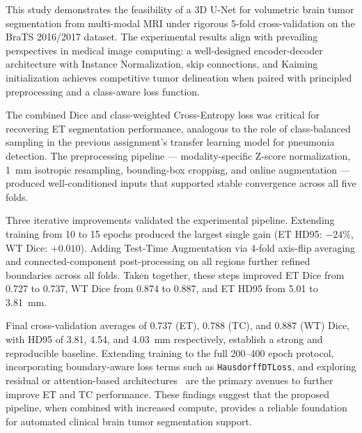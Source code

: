 \documentclass[10pt,twocolumn]{article}
\begin{document}
This study demonstrates the feasibility of a 3D U-Net for
volumetric brain tumor segmentation from multi-modal MRI under
rigorous 5-fold cross-validation on the BraTS 2016/2017 dataset.
The experimental results align with prevailing perspectives in
medical image computing: a well-designed encoder-decoder
architecture with Instance Normalization, skip connections, and
Kaiming initialization achieves competitive tumor delineation
when paired with principled preprocessing and a class-aware loss
function.

The combined Dice and class-weighted Cross-Entropy loss was
critical for recovering ET segmentation performance, analogous to
the role of class-balanced sampling in the previous assignment's
transfer learning model for pneumonia detection. The
preprocessing pipeline --- modality-specific Z-score
normalization, 1~mm isotropic resampling, bounding-box cropping,
and online augmentation --- produced well-conditioned inputs that
supported stable convergence across all five folds.

Three iterative improvements validated the experimental pipeline.
Extending training from 10 to 15 epochs produced the largest
single gain (ET HD95: $-24\%$, WT Dice: $+0.010$). Adding
Test-Time Augmentation via 4-fold axis-flip averaging and
connected-component post-processing on all regions further
refined boundaries across all folds. Taken together, these
steps improved ET Dice from 0.727 to 0.737, WT Dice from 0.874
to 0.887, and ET HD95 from 5.01 to 3.81~mm.

Final cross-validation averages of 0.737 (ET), 0.788 (TC), and
0.887 (WT) Dice, with HD95 of 3.81, 4.54, and 4.03~mm
respectively, establish a strong and reproducible baseline.
Extending training to the full 200--400 epoch protocol,
incorporating boundary-aware loss terms such as
\texttt{HausdorffDTLoss}, and exploring residual or
attention-based architectures~\cite{hatamizadeh2022} are the
primary avenues to further improve ET and TC performance.
These findings suggest that the proposed pipeline, when combined
with increased compute, provides a reliable foundation for
automated clinical brain tumor segmentation support.
\end{document}
